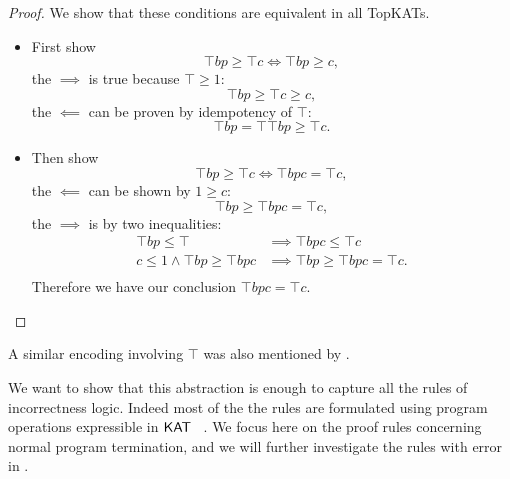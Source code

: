 \begin{proof}
We show that these conditions are equivalent in all TopKATs.
\begin{itemize}
    \item First show \[\top b p \geq \top c \iff \top b p \geq c,\]
    the \(\implies\) is true because \(\top \geq 1\):
    \[\top b p \geq \top c \geq c,\]
    the \(\impliedby\) can be proven by idempotency of \(\top\):
    \[\top b p = \top \top b p \geq \top c.\]
    \item Then show \[\top b p \geq \top c \iff \top b p c = \top c,\]
    the \(\impliedby\) can be shown by \(1 \geq c\):
    \[\top b p \geq \top b p c = \top c,\]
    the \(\implies\) is by two inequalities:
    \begin{align*}
        \top b p \leq \top & \implies \top b p c \leq \top c \\
        c \leq 1 \land \top b p \geq \top b p c & \implies \top b p \geq \top b p c = \top c.\\
    \end{align*}
    Therefore we have our conclusion \(\top b p c = \top c\).
\end{itemize}
\end{proof}

A similar encoding involving \(\top\) was also mentioned by \citet{OHearn_2020}.

We want to show that this abstraction is enough to capture all the rules of
incorrectness logic.  Indeed most of the the rules are formulated using program
operations expressible in \(\mathsf{KAT}\) ~\cite{OHearn_2020}.  We
focus here on the proof rules concerning normal program termination, and we will
further investigate the rules with error in .


